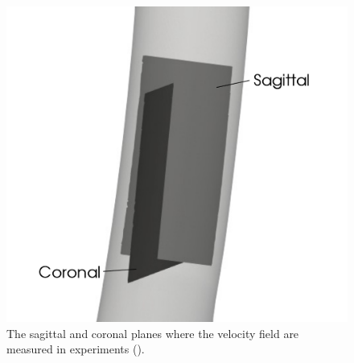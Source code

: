 \begin{figure}[htbp]
\begin{minipage}[c][8cm][c]{0.15\textwidth}
    \end{minipage}
    \begin{minipage}[c][8cm][c]{0.2\textwidth} 
    \includegraphics[scale=0.25]{imgs/vena_cava/venacava_piv3.pdf}
    \end{minipage} 
    \caption{The sagittal and coronal planes where the velocity field are measured in experiments (\cite{gallagher_exp}).}
    \label{fig:IVCPIV}
\end{figure}

